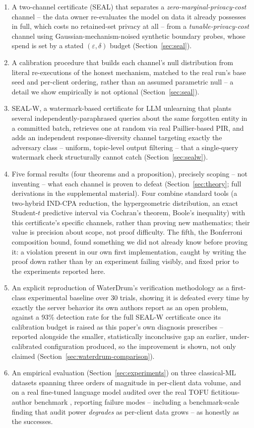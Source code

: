 \documentclass[10pt,journal,compsoc]{IEEEtran}
\begin{document}
\begin{enumerate}
\item A two-channel certificate (SEAL) that separates a \emph{zero-marginal-privacy-cost} channel -- the data owner re-evaluates the model on data it already possesses in full, which costs no retained-set privacy at all -- from a \emph{tunable-privacy-cost} channel using Gaussian-mechanism-noised synthetic boundary probes, whose spend is set by a stated $(\varepsilon,\delta)$ budget (Section~\ref{sec:seal}).
\item A calibration procedure that builds each channel's null distribution from literal re-executions of the honest mechanism, matched to the real run's base seed and per-client ordering, rather than an assumed parametric null -- a detail we show empirically is not optional (Section~\ref{sec:seal}).
\item SEAL-W, a watermark-based certificate for LLM unlearning that plants several independently-paraphrased queries about the same forgotten entity in a committed batch, retrieves one at random via real Paillier-based PIR, and adds an independent response-diversity channel targeting exactly the adversary class -- uniform, topic-level output filtering -- that a single-query watermark check structurally cannot catch (Section~\ref{sec:sealw}).
\item Five formal results (four theorems and a proposition), precisely scoping -- not inventing -- what each channel is proven to defeat (Section~\ref{sec:theory}; full derivations in the supplemental material). Four combine standard tools (a two-hybrid IND-CPA reduction, the hypergeometric distribution, an exact Student-$t$ predictive interval via Cochran's theorem, Boole's inequality) with this certificate's specific channels, rather than proving new mathematics; their value is precision about scope, not proof difficulty. The fifth, the Bonferroni composition bound, found something we did not already know before proving it: a violation present in our own first implementation, caught by writing the proof down rather than by an experiment failing visibly, and fixed prior to the experiments reported here.
\item An explicit reproduction of WaterDrum's verification methodology \cite{lu2026waterdrum} as a first-class experimental baseline over 30 trials, showing it is defeated every time by exactly the server behavior its own authors report as an open problem, against a 93\% detection rate for the full SEAL-W certificate once its calibration budget is raised as this paper's own diagnosis prescribes -- reported alongside the smaller, statistically inconclusive gap an earlier, under-calibrated configuration produced, so the improvement is shown, not only claimed (Section~\ref{sec:waterdrum-comparison}).
\item An empirical evaluation (Section~\ref{sec:experiments}) on three classical-ML datasets spanning three orders of magnitude in per-client data volume, and on a real fine-tuned language model audited over the real TOFU fictitious-author benchmark \cite{maini2024tofu}, reporting failure modes -- including a benchmark-scale finding that audit power \emph{degrades} as per-client data grows -- as honestly as the successes.
\end{enumerate}
\end{document}
